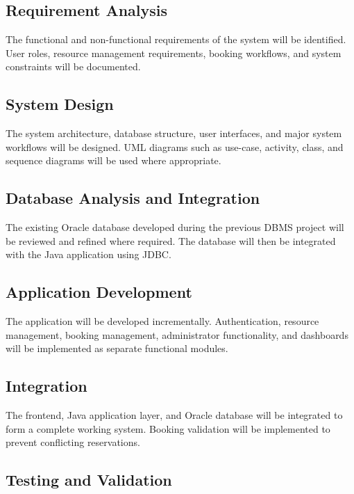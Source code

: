 \documentclass[12pt,a4paper]{article}
\begin{document}
\subsection{Requirement Analysis}

The functional and non-functional requirements of the system will
be identified. User roles, resource management requirements,
booking workflows, and system constraints will be documented.

\subsection{System Design}

The system architecture, database structure, user interfaces, and
major system workflows will be designed. UML diagrams such as
use-case, activity, class, and sequence diagrams will be used where
appropriate.

\subsection{Database Analysis and Integration}

The existing Oracle database developed during the previous DBMS
project will be reviewed and refined where required. The database
will then be integrated with the Java application using JDBC.

\subsection{Application Development}

The application will be developed incrementally. Authentication,
resource management, booking management, administrator
functionality, and dashboards will be implemented as separate
functional modules.

\subsection{Integration}

The frontend, Java application layer, and Oracle database will be
integrated to form a complete working system. Booking validation
will be implemented to prevent conflicting reservations.

\subsection{Testing and Validation}
\end{document}
